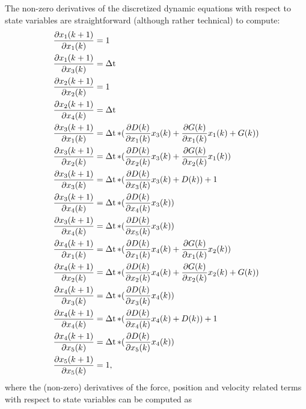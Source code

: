 The non-zero derivatives of the discretized dynamic equations with
respect to state variables are straightforward (although rather
technical) to compute:
%
\begin{equation}
\begin{split}
%
\frac{\partial x_1(k+1)}{\partial x_1(k)} & = 1 \\ \frac{\partial
x_1(k+1)}{\partial x_3(k)} & = \dt \\ \frac{\partial
x_2(k+1)}{\partial x_2(k)} & = 1 \\ \frac{\partial x_2(k+1)}{\partial
x_4(k)} & = \dt \\
%
\frac{\partial x_3(k+1)}{\partial x_1(k)} & = \dt * (\frac{\partial
D(k)}{\partial x_1(k)} x_3(k) + \frac{\partial G(k)}{\partial x_1(k)}
x_1(k) + G(k)) \\ \frac{\partial x_3(k+1)}{\partial x_2(k)} & = \dt *
(\frac{\partial D(k)}{\partial x_2(k)} x_3(k) + \frac{\partial
G(k)}{\partial x_2(k)} x_1(k)) \\ \frac{\partial x_3(k+1)}{\partial
x_3(k)} & = \dt * (\frac{\partial D(k)}{\partial x_3(k)} x_3(k) +
D(k)) + 1 \\ \frac{\partial x_3(k+1)}{\partial x_4(k)} & = \dt *
(\frac{\partial D(k)}{\partial x_4(k)} x_3(k)) \\ \frac{\partial
x_3(k+1)}{\partial x_4(k)} & = \dt * (\frac{\partial D(k)}{\partial
x_5(k)} x_3(k)) \\
%
\frac{\partial x_4(k+1)}{\partial x_1(k)} & = \dt * (\frac{\partial
D(k)}{\partial x_1(k)} x_4(k) + \frac{\partial G(k)}{\partial x_1(k)}
x_2(k)) \\ \frac{\partial x_4(k+1)}{\partial x_2(k)} & = \dt *
(\frac{\partial D(k)}{\partial x_2(k)} x_4(k) + \frac{\partial
G(k)}{\partial x_2(k)} x_2(k) + G(k)) \\ \frac{\partial
x_4(k+1)}{\partial x_3(k)} & = \dt * (\frac{\partial D(k)}{\partial
x_3(k)} x_4(k)) \\ \frac{\partial x_4(k+1)}{\partial x_4(k)} & = \dt *
(\frac{\partial D(k)}{\partial x_4(k)} x_4(k) + D(k)) + 1 \\
\frac{\partial x_4(k+1)}{\partial x_5(k)} & = \dt * (\frac{\partial
D(k)}{\partial x_5(k)} x_4(k)) \\ \frac{\partial x_5(k+1)}{\partial
x_5(k)} & = 1,
%
\end{split}
\end{equation}
%
where the (non-zero) derivatives of the force, position and velocity
related terms with respect to state variables can be computed as
%
